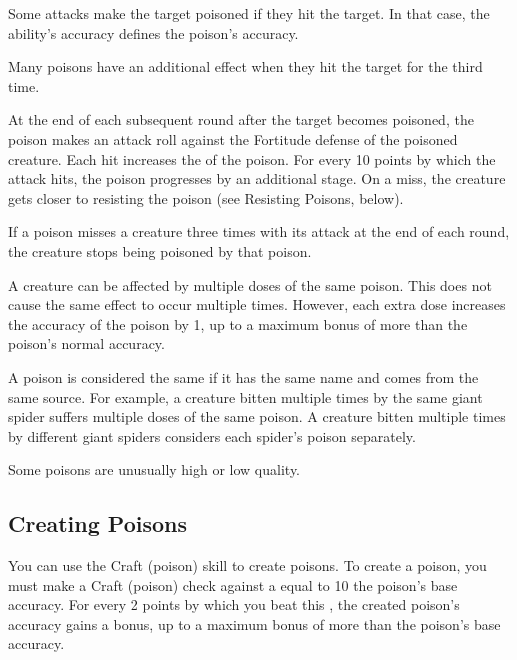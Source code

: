         Some attacks make the target poisoned if they hit the target.
        In that case, the ability's accuracy defines the poison's accuracy.

        Many poisons have an additional effect when they hit the target for the third time.

        At the end of each subsequent round after the target becomes poisoned, the poison makes an attack roll against the Fortitude defense of the poisoned creature.
        Each hit increases the  of the poison.
        For every 10 points by which the attack hits, the poison progresses by an additional stage.
        On a miss, the creature gets closer to resisting the poison (see Resisting Poisons, below).

        If a poison misses a creature three times with its attack at the end of each round, the creature stops being poisoned by that poison.

        A creature can be affected by multiple doses of the same poison.
        This does not cause the same effect to occur multiple times.
        However, each extra dose increases the accuracy of the poison by 1, up to a maximum bonus of  more than the poison's normal accuracy.

        A poison is considered the same if it has the same name and comes from the same source.
        For example, a creature bitten multiple times by the same giant spider suffers multiple doses of the same poison.
        A creature bitten multiple times by different giant spiders considers each spider's poison separately.

         Some poisons are unusually high or low quality.

    \subsection{Creating Poisons}\label{Creating Poisons}

        You can use the Craft (poison) skill to create poisons.
        To create a poison, you must make a Craft (poison) check against a  equal to 10 \add the poison's base accuracy.
        For every 2 points by which you beat this , the created poison's accuracy gains a  bonus, up to a maximum bonus of  more than the poison's base accuracy.

